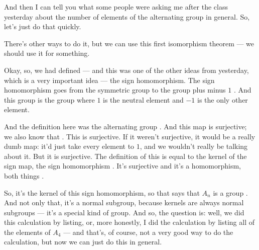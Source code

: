 \begin{speech}[00:11:02 - 00:12:55]
And then I can tell you what some people were asking me after the class yesterday about the number of elements of the alternating group in general. So, let's just do that quickly. 

There's other ways to do it, but we can use this first isomorphism theorem --- we should use it for something.

Okay, so, we had defined --- and this was one of the other ideas from yesterday, which is a very important idea --- the sign homomorphism. The sign homomorphism goes from the symmetric group to the group plus minus $1$ . And this group is the group where $1$ is the neutral element and $-1$ is the only other element.

And the definition here was the alternating group . And this map is surjective; we also know that . This is surjective. If it weren't surjective, it would be a really dumb map: it'd just take every element to $1$, and we wouldn't really be talking about it. But it is surjective. The definition of this is equal to the kernel of the sign map, the sign homomorphism . It's surjective and it's a homomorphism, both things .

So, it's the kernel of this sign homomorphism, so that says that $A_n$ is a group . And not only that, it's a normal subgroup, because kernels are always normal subgroups  --- it's a special kind of group. And so, the question is: well, we did this calculation by listing, or, more honestly, I did the calculation by listing all of the elements of $A_4$ --- and that's, of course, not a very good way to do the calculation, but now we can just do this in general.
\end{speech}


